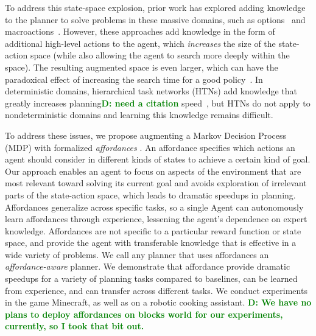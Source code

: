 \documentclass[conference]{IEEEtran}
\newcommand{\dnote}[1]{\textcolor{Green}{\textbf{D: #1}}}
\begin{document}
To address this state-space explosion, prior work has explored adding
knowledge to the planner to solve problems in these massive domains,
such as options~\cite{sutton99} and
macroactions~\cite{Botea:2005kx,Newton:2005vn}. However, these
approaches add knowledge in the form of additional high-level actions
to the agent, which {\em increases} the size of the state-action space
(while also allowing the agent to search more deeply within the
space).  The resulting augmented space is even larger, which can have
the paradoxical effect of increasing the search time for a good
policy~\cite{Jong:2008zr}.  In deterministic domains, hierarchical
task networks (HTNs) add knowledge that greatly increases planning\dnote{need a citation}
speed~\citep{}, but HTNs do not apply to nondeterministic domains and
learning this knowledge remains difficult.


To address these issues, we propose augmenting a Markov Decision
Process (MDP) with formalized {\em affordances} \cite{gibson77}.  An
affordance specifies which actions an agent should consider in
different kinds of states to achieve a certain kind of goal.  Our
approach enables an agent to focus on aspects of the environment that
are most relevant toward solving its current goal and avoids
exploration of irrelevant parts of the state-action space, which leads
to dramatic speedups in planning.  Affordances generalize across
specific tasks, so a single Agent can autonomously learn affordances
through experience, lessening the agent's dependence on expert
knowledge. Affordances are not specific to a particular reward
function or state space, and provide the agent with transferable
knowledge that is effective in a wide variety of problems. We call any
planner that uses affordances an {\it affordance-aware} planner.  We
demonstrate that affordance provide dramatic speedups for a variety
of planning tasks compared to baselines, can be learned from
experience, and can transfer across different tasks.  We conduct experiments
in the game Minecraft, as well as on a robotic cooking assistant. 
\dnote{We have no plans to deploy affordances on blocks world for our experiments, currently, so I took that bit out.}

\end{document}
